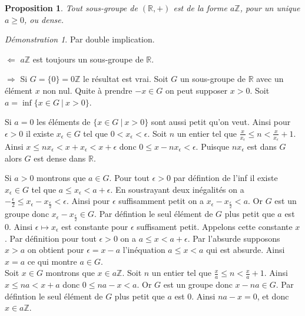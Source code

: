 \documentclass[a4paper, 11pt, french]{book}
\newenvironment{itemise}{\itemize}{\enditemize}
\theoremstyle{plain} %
\newtheorem{proposition}{Proposition}
\theoremstyle{definition} %
\theoremstyle{remark} %
\newtheorem*{demonstration}{Démonstration}
\newcommand{\1}{\mathds{1}}
\newcommand{\infegal}{\leqslant}
\newcommand{\supegal}{\geqslant}
\newcommand{\Z}{\mathbb{Z}}
\newcommand{\R}{\mathbb{R}}
\begin{document}
\begin{proposition}
	Tout sous-groupe de $(\R, +)$ est de la forme $a\Z$, pour un unique $a\supegal0$, ou dense.
\end{proposition}

\begin{demonstration}
	Par double implication.
	\begin{itemise}
		\item[$\Leftarrow$] $a\Z$ est toujours un sous-groupe de $\R$.
		\item[$\Rightarrow$] Si $G=\{0\}=0\Z$ le résultat est vrai.
		Soit $G$ un sous-groupe de $\R$ avec un élément $x$ non nul.
		Quite à prendre $-x\in G$ on peut supposer $x>0$.
		Soit $a=\inf\{x\in G \ |\ x>0\}$.
		\begin{itemise}
			\item Si $a=0$ les éléments de $\{x\in G \ | \ x > 0\}$ sont aussi petit qu'on veut.
			Ainsi pour $\epsilon > 0$ il existe $x_\epsilon\in G$ tel que $0 < x_\epsilon < \epsilon$.
			Soit $n$ un entier tel que $\frac{x}{x_\epsilon} \infegal n < \frac{x}{x_\epsilon} + 1$.
			Ainsi $x \infegal nx_\epsilon < x + x_\epsilon < x + \epsilon$ donc $0 \infegal x - nx_\epsilon < \epsilon$.
			Puisque $nx_\epsilon$ est dans $G$ alors $G$ est dense dans $\R$.

			\item Si $a>0$ montrons que $a\in G$.
			Pour tout $\epsilon > 0$ par défintion de l'inf il existe $x_\epsilon\in G$ tel que $a \infegal x_\epsilon < a + \epsilon$.
			En soustrayant deux inégalités on a $-\frac{\epsilon}{2}\infegal x_\epsilon - x_\frac{\epsilon}{2} < \epsilon$.
			Ainsi pour $\epsilon$ suffisamment petit on a $x_\epsilon - x_\frac{\epsilon}{2} < a$.
			Or $G$ est un groupe donc $x_\epsilon - x_\frac{\epsilon}{2}\in G$.
			Par défintion le seul élément de $G$ plus petit que $a$ est $0$.
			Ainsi $\epsilon\mapsto x_\epsilon$ est constante pour $\epsilon$ suffisament petit.
			Appelons cette constante $x$.
			Par définition pour tout $\epsilon > 0$ on a $a\infegal x < a + \epsilon$.
			Par l'absurde supposons $x > a$ on obtient pour $\epsilon = x - a$ l'inéquation $a\infegal x < a$ qui est absurde.
			Ainsi $x=a$ ce qui montre $a\in G$. \\
			Soit $x\in G$ montrons que $x\in a\Z$.
			Soit $n$ un entier tel que $\frac{x}{a} \infegal n < \frac{x}{a} + 1$.
			Ainsi $x \infegal na < x + a$ donc $0 \infegal na - x < a$.
			Or $G$ est un groupe donc $x - na\in G$.
			Par défintion le seul élément de $G$ plus petit que $a$ est $0$.
			Ainsi $na - x=0$, et donc $x\in a\Z$.
		\end{itemise}
	\end{itemise}
\end{demonstration}
\end{document}
